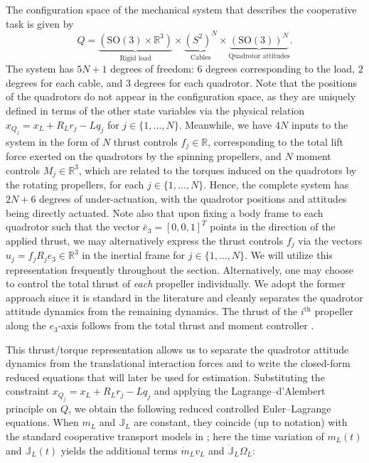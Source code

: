 \documentclass[letterpaper, 10 pt, conference]{ieeeconf}  %
\newcommand{\R}{\mathbb{R}}
\newcommand{\SO}{\text{SO}}
\begin{document}
The configuration space of the mechanical system that describes the cooperative task is given by $$Q = \underbrace{(\SO(3) \times \R^{3})}_{\text{Rigid load}} \times\underbrace{(S^{2})^{N}}_{\text{Cables}}\times\underbrace{(\SO(3))^{N}}_{\text{Quadrotor attitudes}}.$$ The system has $5N+1$ degrees of freedom: $6$ degrees corresponding to the load, $2$ degrees for each cable, and $3$ degrees for each quadrotor. Note that the positions of the quadrotors do not appear in the configuration space, as they are uniquely defined in terms of the other state variables via the physical relation $x_{Q_{j}} = x_{L} + R_{L} r_{j} - L q_{j}$ for $j \in \{1, \dots, N\}$. Meanwhile, we have $4N$ inputs to the system in the form of $N$ thrust controls $f_{j} \in \R$, corresponding to the total lift force exerted on the quadrotors by the spinning propellers, and $N$ moment controls $M_{j} \in \R^{3}$, which are related to the torques induced on the quadrotors by the rotating propellers, for each $j \in \{1, \dots, N\}$. Hence, the complete system has $2N + 6$ degrees of under-actuation, with the quadrotor positions and attitudes being directly actuated. Note also that upon fixing a body frame to each quadrotor such that the vector $\bar{e}_{3} = [0, 0, 1]^{T}$ points in the direction of the applied thrust, we may alternatively express the thrust controls $f_{j}$ via the vectors $u_{j}=f_{j}R_{j}e_{3}\in\mathbb{R}^{3}$ in the inertial frame for $j \in \{1,\dots, N\}$. We will utilize this representation frequently throughout the section. Alternatively, one may choose to control the total thrust of \textit{each} propeller individually. We adopt the former approach since it is standard in the literature and cleanly separates the quadrotor attitude dynamics from the remaining dynamics. The thrust of the $i^{\text{th}}$ propeller along the $e_{3}$-axis follows from the total thrust and moment controller \cite{lee_geometric_2010}.

This thrust/torque representation allows us to separate the quadrotor attitude dynamics from the
translational interaction forces and to write the closed-form reduced equations that will later be
used for estimation. Substituting the constraint $x_{Q_j}=x_L+R_L r_j-Lq_j$ and applying the
Lagrange--d'Alembert principle on $Q$, we obtain the following reduced controlled
Euler--Lagrange equations. When $m_L$ and $\mathbb{J}_L$ are constant, they coincide (up to notation)
with the standard cooperative transport models in \cite{jacob1}; here the time
variation of $m_L(t)$ and $\mathbb{J}_L(t)$ yields the additional terms $\dot m_L v_L$ and
$\dot{\mathbb{J}}_L\Omega_L$:
\end{document}
